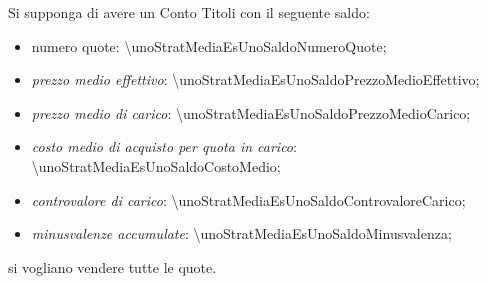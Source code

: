 \documentclass[12pt,a4paper]{article}
\newcommand{\Eur}[1]{\SI{#1}{\text{\euro{}}}}
\begin{document}
Si supponga di avere un Conto Titoli con il seguente saldo:
\begin{itemize}
\item numero quote: \num{\unoStratMediaEsUnoSaldoNumeroQuote};
\item \emph{prezzo medio effettivo}: \Eur{\unoStratMediaEsUnoSaldoPrezzoMedioEffettivo};
\item \emph{prezzo medio di carico}: \Eur{\unoStratMediaEsUnoSaldoPrezzoMedioCarico};
\item \emph{costo medio di acquisto per quota in carico}: \Eur{\unoStratMediaEsUnoSaldoCostoMedio};
\item \emph{controvalore di carico}: \Eur{\unoStratMediaEsUnoSaldoControvaloreCarico};
\item \emph{minusvalenze accumulate}: \Eur{\unoStratMediaEsUnoSaldoMinusvalenza};
\end{itemize}
si vogliano vendere tutte le quote.

\end{document}
